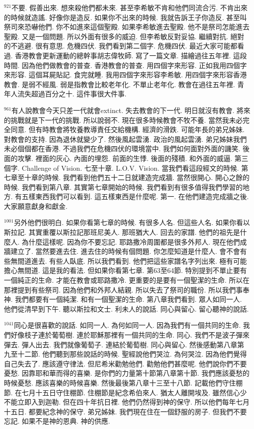 \documentclass{book}
\begin{document}
$^{921}$不要.
假善出來.
想來殺他們都未來.
甚至李希敏不肯和他們同流合污.
不肯出來的時候就造謠.
好像你是造反.
如果你不出來的時候.
我就告訴王子你造反.
甚至叫祭司來恐嚇他們.
你不如進來這個聖殿.
如果李希敏進去聖殿.
他不是祭司怎能進去聖殿.
又是一個問題.
所以外面有很多的威迫.
但李希敏反對妥協.
繼續對抗.
絕對的不逃避.
很有意思.
危機四伏.
我們看到第二個字.
危機四伏.
最近大家可能都看過.
香港教會更新運動的總幹事胡志偉牧師.
寫了一篇文章.
描繪過往五年裡.
這段時間.
因為他們做教會的普查.
香港教會的普查.
用四個字來形容.
正如我用四個字來形容.
這個耳屍貼記.
食完就睡.
我用四個字來形容李希敏.
用四個字來形容香港教會.
是弱不經風.
弱是指教會比較老年化.
不單止老年化.
教會在過往五年裡.
青年人流失超過百分之十.
這件事很大件事.

$^{961}$有人說教會今天只差一代就會extinct.
失去教會的下一代.
明日就沒有教會.
將來的挑戰就是下一代的挑戰.
所以說弱不.
現在很多時候教會不牧不養.
當然我未必完全同意.
但有時教會將牧養教導責任交給機構.
經濟的滑跌.
可能年長的弟兄姊妹.
對教會的支持.
因為退休就變少了.
然後風起雲湧.
政治的風起雲湧.
弟兄姊妹我們未必個個都在香港.
不過我們在危機四伏的環境當中.
我們如何面對外面的譏笑.
後面的攻擊.
裡面的灰心.
內面的埋怨.
前面的生悸.
後面的殘積.
和外面的威逼.
第三個字.
Challenge of Vision.
七至十章.
L.O.V. Vision.
當我們看這段經文的時候.
第七章至十章的時候.
我們看到他們五十二日就建造完成牆.
當然很開心.
開心之餘的時候.
我們看到第八章.
其實第七章開始的時候.
我們看到有很多值得我們學習的地方.
有五樣東西我們可以看到.
這五樣東西是什麼呢.
第一.
在他們建造完成牆之後.
大家願意獻身和獻金.

$^{1001}$另外他們很明白.
如果你看第七章的時候.
有很多人名.
但這些人名.
如果你看以斯拉記.
其實重覆以斯拉記那班尼美人.
那班猶大人.
回去的家譜.
他們的祖先是什麼人.
為什麼這樣呢.
因為你不要忘記.
耶路撒冷周圍都是很多外邦人.
現在他們成牆建立了.
當然要進去住.
進去住的時候有個問題.
你怎麼知道是什麼人.
會不會有些無間道進去.
有些人臥底.
所以我們看到.
他們把這些家譜名字列出來.
極有可能擔心無間道.
這是我的看法.
但如果你看第七章.
第63至64節.
特別提到不單止要有一個純正的生命.
才能在教會或耶路撒冷.
更重要的是要有一個聖潔的生命.
所以在那裡提到有些祭司.
因為他們和外邦人結親.
所以失去了祭司的職份.
所以我們事奉神.
我們都要有一個純潔.
和有一個聖潔的生命.
第八章我們看到.
眾人如同一人.
他們從清早到下午.
聽以斯拉和文士.
利未人的說話.
同心與留心.
留心聽神的說話.

$^{1041}$同心是很喜歡的說話.
如同一人.
為何如同一人.
因為我們有一個共同的生命.
我們好像枝子連於葡萄樹.
連於耶穌那裡有一個共同的生命.
同心.
我們不是波子彈來彈去.
彈人出去.
我們就像葡萄子.
連結於葡萄樹.
同心與留心.
然後感動第八章第九至十二節.
他們聽到那些說話的時候.
聖經說他們哭泣.
為何哭泣.
因為他們覺得自己失去了.
應該遵守律法.
但尼希米勸勉他們.
勸勉他們甚麼呢.
他們說你們不要憂愁.
因靠耶和華而得的喜樂.
是你們的力量第十節第八章第十節.
我們應該憂愁的時候憂愁.
應該喜樂的時候喜樂.
然後最後第八章十三至十八節.
記載他們守住棚節.
在七月十五日守住棚節.
住棚節是紀念希伯來人.
猶太人離開埃及.
雖然信心少不能立即入到迦勒.
但在四十年抗日裡.
他們仍然得到神的保守.
所以他們每年七月十五日.
都要紀念神的保守.
弟兄姊妹.
我們現在住在一個舒服的房子.
但我們不要忘記.
如果不是神的恩典.
神的供應.
\end{document}
